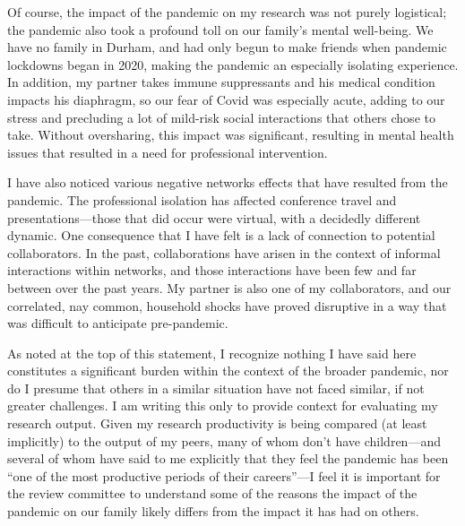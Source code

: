 \documentclass[11pt]{article}
\begin{document}
Of course, the impact of the pandemic on my research was not purely logistical; the pandemic also took a profound toll on our family's mental well-being. We have no family in Durham, and had only begun to make friends when pandemic lockdowns began in 2020, making the pandemic an especially isolating experience. In addition, my partner takes immune suppressants and his medical condition impacts his diaphragm, so our fear of Covid was especially acute, adding to our stress and precluding a lot of mild-risk social interactions that others chose to take.  Without oversharing, this impact was significant, resulting in mental health issues that resulted in a need for professional intervention.

I have also noticed various negative networks effects that have resulted from the pandemic.  The professional isolation has affected conference travel and presentations---those that did occur were virtual, with a decidedly different dynamic.  One consequence that I have felt is a lack of connection to potential collaborators.  In the past, collaborations have arisen in the context of informal interactions within networks, and those interactions have been few and far between over the past years. My partner is also one of my collaborators, and our correlated, nay common, household shocks have proved disruptive in a way that was difficult to anticipate pre-pandemic.

As noted at the top of this statement, I recognize nothing I have said here constitutes a significant burden within the context of the broader pandemic, nor do I presume that others in a similar situation have not faced similar, if not greater challenges.  I am writing this only to provide context for evaluating my research output.  Given my research productivity is being compared (at least implicitly) to the output of my peers, many of whom don't have children---and several of whom have said to me explicitly that they feel the pandemic has been ``one of the most productive periods of their careers''---I feel it is important for the review committee to understand some of the reasons the impact of the pandemic on our family likely differs from the impact it has had on others.
\end{document}
